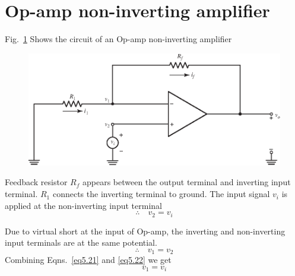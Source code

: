 
\eject

\section{Op-amp non-inverting amplifier}\label{sec5.8}

Fig.~\ref{fig5.10} Shows the circuit of an Op-amp non-inverting amplifier
\begin{figure}[H]
\centering
\includegraphics[scale=1.1]{chap4/S3-EE-06-017b.eps}

\smallskip
\caption{}\label{fig5.10}
\end{figure}

Feedback resistor $R_{f}$ appears between the output terminal and inverting input terminal. $R_{1}$ connects the inverting terminal to ground. The input signal $v_{i}$ is applied at the non-inverting input terminal
\begin{equation}
\therefore\quad v_{2}=v_{i}\label{eq5.21}
\end{equation}

Due to virtual short at the input of Op-amp, the inverting and non-inverting input terminals are at the same potential.
\begin{equation}
\therefore\quad v_{1}=v_{2}\label{eq5.22}
\end{equation}
Combining Eqns.~\eqref{eq5.21} and \eqref{eq5.22} we get
\begin{equation}
v_{1}=v_{i}\label{eq5.23}
\end{equation}

